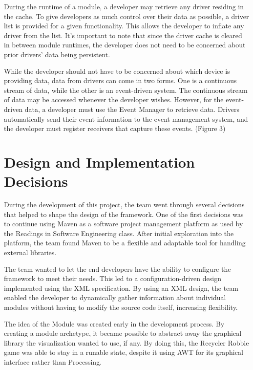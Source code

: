 \documentclass[11pt,letterpaper]{article}
\begin{document}
	During the runtime of a module, a developer may retrieve any driver 
	residing in the cache. To give developers as much control over their data 
	as possible, a driver list is provided for a given functionality. This 
	allows the developer to inflate any driver from the list. It's important 
	to note that since the driver cache is cleared in between module runtimes, 
	the developer does not need to be concerned about prior drivers' data 
	being persistent.

	While the developer should not have to be concerned about which device is 
	providing data, data from drivers can come in two forms. One is a 
	continuous stream of data, while the other is an event-driven system. The 
	continuous stream of data may be accessed whenever the developer wishes. 
	However, for the event-driven data, a developer must use the Event Manager 
	to retrieve data. Drivers automatically send their event information to 
	the event management system, and the developer must register receivers 
	that capture these events.
	(Figure 3)

	\pagebreak
   
	\section{Design and Implementation Decisions}

	During the development of this project, the team went through several 
	decisions that helped to shape the design of the framework. One of the 
	first decisions was to continue using Maven as a software project 
	management platform as used by the Readings in Software Engineering class. 
	After initial exploration into the platform, the team found Maven to be a 
	flexible and adaptable tool for handling external libraries.

	The team wanted to let the end developers have the ability to configure 
	the framework to meet their needs. This led to a configuration-driven 
	design implemented using the XML specification. By using an XML design, 
	the team enabled the developer to dynamically gather information about 
	individual modules without having to modify the source code itself, 
	increasing flexibility. 

	The idea of the Module was created early in the development process.  By 
	creating a module archetype, it became possible to abstract away the graphical 
	library the visualization wanted to use, if any. By doing this, 
	the Recycler Robbie game was able to stay in a runable state, despite it using AWT for 
	its graphical interface rather than Processing.
\end{document}
